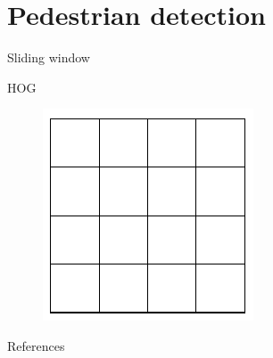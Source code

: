 \documentclass[14pt,t]{beamer}
\begin{document}
\section{Pedestrian detection}
%
\begin{frame}{Sliding window}
\begin{figure}
\centering
\end{figure}
\end{frame}
%
\begin{frame}{HOG \cite{dalal2005histograms}}
\begin{minipage}[t]{0.7\textwidth}
\end{minipage}
\begin{minipage}[t]{0.25\textwidth}
	\begin{figure}
		\includegraphics[width=\textwidth]{../report/img/siftGrid.pdf}
	\end{figure}
\end{minipage}
\end{frame}
%
\begin{frame}{References}
\printbibliography
\end{frame}
%
\end{document}
